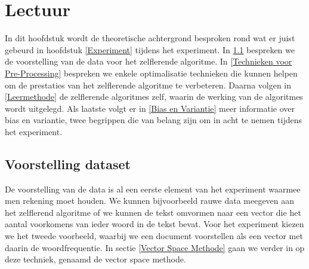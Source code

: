 \chapter{Lectuur}\label{Lectuur}

In dit hoofdstuk wordt de theoretische achtergrond besproken rond wat er juist gebeurd in hoofdstuk \ref{Experiment} tijdens het experiment. In \ref{Voorstelling dataset} bespreken we de voorstelling van de data voor het zelflerende algoritme. In \ref{Technieken voor Pre-Processing} bespreken we enkele optimalisatie technieken die kunnen helpen om de prestaties van het zelflerende algoritme te verbeteren. Daarna volgen in \ref{Leermethode} de zelflerende algoritmes zelf, waarin de werking van de algoritmes wordt uitgelegd. Als laatste volgt er in \ref{Bias en Variantie} meer informatie over bias en variantie, twee begrippen die van belang zijn om in acht te nemen tijdens het experiment.

\section{Voorstelling dataset}\label{Voorstelling dataset}
%
De voorstelling van de data is al een eerste element van  het experiment waarmee men rekening moet houden. We kunnen bijvoorbeeld rauwe data meegeven aan het zelflerend algoritme of we kunnen de tekst omvormen naar een vector die het aantal voorkomens van ieder woord in de tekst bevat. Voor het experiment kiezen we het tweede voorbeeld, waarbij we een document voorstellen als een vector met daarin de woordfrequentie.
In sectie \ref{Vector Space Methode} gaan we verder in op deze techniek, genaamd de vector space methode.

